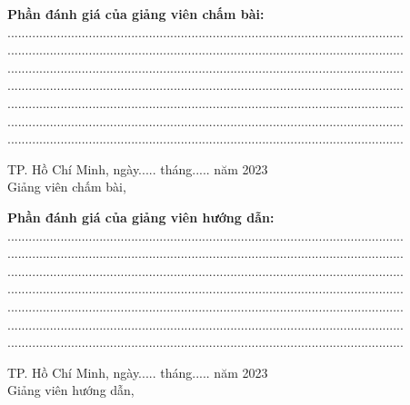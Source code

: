 \documentclass[13pt]{report}
\begin{document}
	\textbf{Phần đánh giá của giảng viên chấm bài:}\\
	................................................................................................................\\
	................................................................................................................\\
	................................................................................................................\\
	................................................................................................................\\
	................................................................................................................\\
	................................................................................................................\\
	................................................................................................................\\
	\begin{center}
		\hspace*{5cm} TP. Hồ Chí Minh, ngày..... tháng..... năm 2023\\
		\hspace*{5cm} Giảng viên chấm bài,
		\vspace*{2cm}
	\end{center}
	\textbf{Phần đánh giá của giảng viên hướng dẫn:}\\
	................................................................................................................\\
	................................................................................................................\\
	................................................................................................................\\
	................................................................................................................\\
	................................................................................................................\\
	................................................................................................................\\
	................................................................................................................\\
	\begin{center}
		\hspace*{5cm} TP. Hồ Chí Minh, ngày..... tháng..... năm 2023\\
		\hspace*{5cm} Giảng viên hướng dẫn,
		\newpage
	\end{center}
	\newpage
	\tableofcontents
	\newpage
\end{document}
